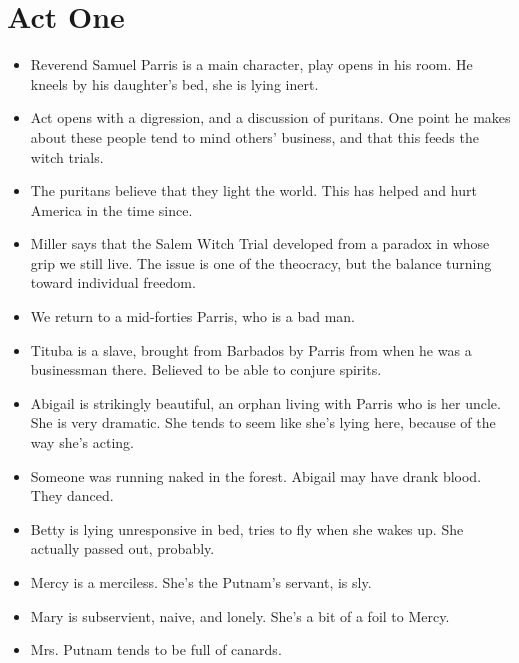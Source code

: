\documentclass[10pt]{article}
\begin{document}
\section{Act One}
\begin{itemize}
	\item Reverend Samuel Parris is a main character, play opens in his room.
		He kneels by his daughter's bed, she is lying inert.
	\item Act opens with a digression, and a discussion of puritans.  One
		point he makes about these people tend to mind others' business, and
		that this feeds the witch trials.
	\item The puritans believe that they light the world.  This has helped
		and hurt America in the time since.
	\item Miller says that the Salem Witch Trial developed from a paradox
		in whose grip we still live.  The issue is one of the theocracy, but
		the balance turning toward individual freedom.
	\item We return to a mid-forties Parris, who is a bad man.
	\item Tituba is a slave, brought from Barbados by Parris from when he
		was a businessman there.  Believed to be able to conjure spirits.
	\item Abigail is strikingly beautiful, an orphan living with Parris
		who is her uncle.  She is very dramatic.  She tends to seem like
		she's lying here, because of the way she's acting.
	\item Someone was running naked in the forest.  Abigail may have drank 
		blood.  They danced.
	\item Betty is lying unresponsive in bed, tries to fly when she wakes
		up.  She actually passed out, probably.
	\item Mercy is a merciless.  She's the Putnam's servant, is sly.
	\item Mary is subservient, naive, and lonely.  She's a bit of a foil
		to Mercy.
	\item Mrs. Putnam tends to be full of canards.
\end{itemize}
\end{document}
